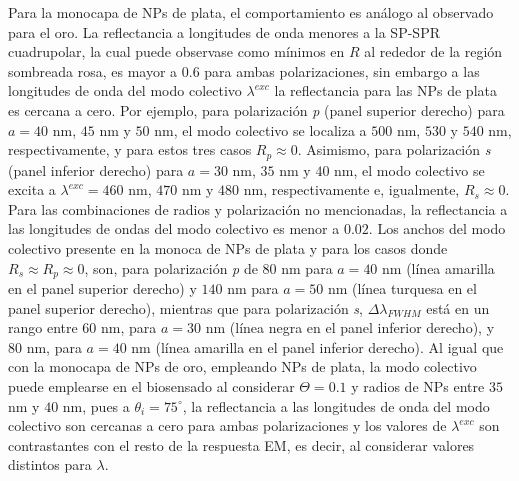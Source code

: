 Para la monocapa de NPs de plata, el comportamiento es análogo al observado para el oro. La reflectancia a longitudes de onda menores a la SP-SPR cuadrupolar, la cual puede observase como mínimos en $R$ al rededor de la región sombreada rosa, es mayor a $0.6$ para ambas polarizaciones, sin embargo a las longitudes de onda del modo colectivo $\lambda^{exc}$ la reflectancia para las NPs de plata es cercana a cero. Por ejemplo, para polarización \emph{p} (panel superior derecho) para $a=40$ nm, $45$ nm y $50$ nm, el modo colectivo se localiza a $500$ nm, $530$ y $540$ nm, respectivamente, y para estos tres casos $R_p\approx 0$. Asimismo, para polarización \emph{s} (panel inferior derecho) para $a=30$ nm, $35$ nm y $40$ nm, el modo colectivo se excita a $\lambda^{exc}=460$ nm, $470$ nm y $480$ nm, respectivamente e, igualmente, $R_s\approx 0$. Para las combinaciones de radios y polarización no mencionadas, la reflectancia a las longitudes de ondas del modo colectivo es menor a $0.02$. Los anchos del modo colectivo presente en la monoca de NPs de plata y para los casos donde $R_s\approx R_p \approx 0$, son, para polarización \emph{p} de $80$ nm para $a=40$ nm (línea amarilla en el panel superior derecho) y $140$ nm para $a=50$ nm (línea turquesa en el panel superior derecho), mientras que para polarización \emph{s}, $\Delta\lambda_{FWHM}$ está en un rango entre $60$ nm, para $a=30$ nm (línea negra en el panel inferior derecho), y $80$ nm, para $a=40$ nm (línea amarilla en el panel inferior derecho). Al igual que con la monocapa de NPs de oro, empleando NPs de plata, la modo colectivo puede emplearse en el biosensado al considerar $\Theta=0.1$ y radios de NPs entre $35$ nm y $40$ nm, pues a $\theta_i=75^\circ$, la reflectancia a las longitudes de onda del modo colectivo son cercanas a cero para ambas polarizaciones y los valores de $\lambda^{exc}$ son contrastantes con el resto de la respuesta EM, es decir, al considerar valores distintos para $\lambda$.


